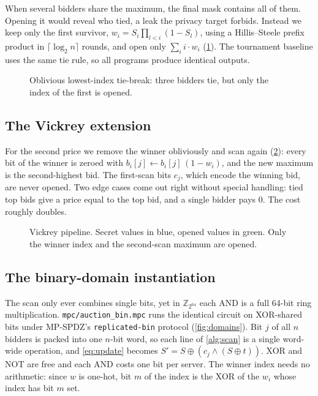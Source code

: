 \documentclass[11pt,a4paper]{article}
\newcommand{\Z}{\mathbb{Z}}
\newcommand{\code}[1]{\texttt{#1}}
\begin{document}
When several bidders share the maximum, the final mask contains all of them. Opening it would
reveal who tied, a leak the privacy target forbids. Instead we keep only the first survivor,
$w_i = S_i \prod_{l<i} (1 - S_l)$, using a Hillis--Steele prefix product in $\lceil\log_2 n\rceil$
rounds, and open only $\sum_i i \cdot w_i$ (\cref{fig:tiebreak}). The tournament baseline uses the
same tie rule, so all programs produce identical outputs.

\begin{figure}[H]
  \centering
  \resizebox{0.8\linewidth}{!}{}
  \caption{Oblivious lowest-index tie-break: three bidders tie, but only the index of the first is
           opened.}
  \label{fig:tiebreak}
\end{figure}

\subsection{The Vickrey extension}

For the second price we remove the winner obliviously and scan again (\cref{fig:vickrey}): every
bit of the winner is zeroed with $b_i[j] \leftarrow b_i[j]\,(1 - w_i)$, and the new maximum is the
second-highest bid. The first-scan bits $c_j$, which encode the winning bid, are never opened.
Two edge cases come out right without special handling: tied top bids give a price equal to the top
bid, and a single bidder pays 0. The cost roughly doubles.

\begin{figure}[H]
  \centering
  \resizebox{0.95\linewidth}{!}{}
  \caption{Vickrey pipeline. Secret values in blue, opened values in green. Only the winner index
           and the second-scan maximum are opened.}
  \label{fig:vickrey}
\end{figure}

\subsection{The binary-domain instantiation}
\label{sec:binary}

The scan only ever combines single bits, yet in $\Z_{2^{64}}$ each AND is a full 64-bit ring
multiplication. \code{mpc/auction\_bin.mpc} runs the identical circuit on XOR-shared bits under
MP-SPDZ's \code{replicated-bin} protocol (\cref{fig:domains}). Bit $j$ of all $n$ bidders is
packed into one $n$-bit word, so each line of \cref{alg:scan} is a single word-wide operation, and
\cref{eq:update} becomes $S' = S \oplus (c_j \wedge (S \oplus t))$. XOR and NOT are free and each
AND costs one bit per server. The winner index needs no arithmetic: since $w$ is one-hot, bit $m$
of the index is the XOR of the $w_i$ whose index has bit $m$ set.
\end{document}
